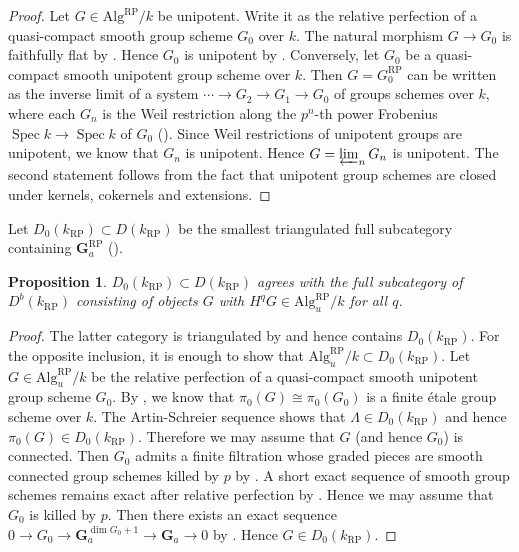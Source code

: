 \documentclass{amsart}
\newtheorem{Prop}[Thm]{Proposition}
\theoremstyle{remark}
\numberwithin{equation}{section}
\newcommand{\Ga}{\mathbf{G}_{a}}
\newcommand{\invlim}{\varprojlim}
\newcommand{\Alg}{\mathrm{Alg}}
\newcommand{\RP}{\mathrm{RP}}
\DeclareMathOperator{\Spec}{Spec}
\begin{document}
\begin{proof}
	Let $G \in \Alg^{\RP} / k$ be unipotent.
	Write it as the relative perfection of a quasi-compact smooth group scheme $G_{0}$ over $k$.
	The natural morphism $G \to G_{0}$ is faithfully flat
	by \cite[Proposition 8.13]{BS20}.
	Hence $G_{0}$ is unipotent by \cite[Chapter IV, Section 2, Proposition 2.3 (a)]{DG70b}.
	Conversely, let $G_{0}$ be a quasi-compact smooth unipotent group scheme over $k$.
	Then $G = G_{0}^{\RP}$ can be written as the inverse limit of a system
	$\cdots \to G_{2} \to G_{1} \to G_{0}$ of groups schemes over $k$,
	where each $G_{n}$ is the Weil restriction
	along the $p^{n}$-th power Frobenius $\Spec k \to \Spec k$ of $G_{0}$
	(\cite[Section 2]{BS20}).
	Since Weil restrictions of unipotent groups are unipotent,
	we know that $G_{n}$ is unipotent.
	Hence $G = \invlim_{n} G_{n}$ is unipotent.
	The second statement follows from the fact that
	unipotent group schemes are closed under kernels, cokernels and extensions.
\end{proof}

Let $D_{0}(k_{\RP}) \subset D(k_{\RP})$ be the smallest triangulated full subcategory
containing $\Ga^{\RP}$ (\cite[Definition 4.2.3]{Kat86}).

\begin{Prop} \label{0000}
	$D_{0}(k_{\RP}) \subset D(k_{\RP})$ agrees with the full subcategory of $D^{b}(k_{\RP})$
	consisting of objects $G$ with $H^{q} G \in \Alg^{\RP}_{u} / k$ for all $q$.
\end{Prop}

\begin{proof}
	The latter category is triangulated by \cite[Tag 06UQ]{Sta22}
	and hence contains $D_{0}(k_{\RP})$.
	For the opposite inclusion, it is enough to show that
	$\Alg^{\RP}_{u} / k \subset D_{0}(k_{\RP})$.
	Let $G \in \Alg^{\RP}_{u} / k$ be the relative perfection of
	a quasi-compact smooth unipotent group scheme $G_{0}$.
	By \cite[Propositions 8.13 and 8.14]{BS20},
	we know that $\pi_{0}(G) \cong \pi_{0}(G_{0})$ is a finite \'etale group scheme over $k$.
	The Artin-Schreier sequence shows that $\Lambda \in D_{0}(k_{\RP})$
	and hence $\pi_{0}(G) \in D_{0}(k_{\RP})$.
	Therefore we may assume that $G$ (and hence $G_{0}$) is connected.
	Then $G_{0}$ admits a finite filtration whose graded pieces are
	smooth connected group schemes killed by $p$ by \cite[Corollary B.3.3]{CGP15}.
	A short exact sequence of smooth group schemes remains exact after relative perfection
	by \cite[Proposition 8.8]{BS20}.
	Hence we may assume that $G_{0}$ is killed by $p$.
	Then there exists an exact sequence
	$0 \to G_{0} \to \Ga^{\dim G_{0} + 1} \to \Ga \to 0$
	by \cite[B.1.13]{CGP15}.
	Hence $G \in D_{0}(k_{\RP})$.
\end{proof}
\end{document}
